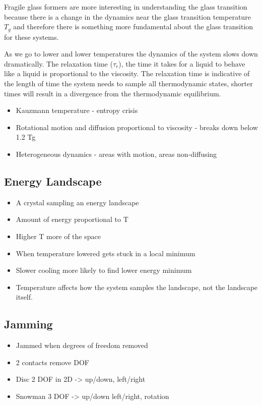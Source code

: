 Fragile glass formers are more interesting in understanding the glass transition because there is a change in the dynamics near the glass transition temperature $T_g$ and therefore there is something more fundamental about the glass transition for these systems. 

As we go to lower and lower temperatures the dynamics of the system slows down dramatically. The relaxation time ($\tau_r$), the time it takes for a liquid to behave like a liquid is proportional to the viscosity. The relaxation time is indicative of the length of time the system needs to sample all thermodynamic states, shorter times will result in a divergence from the thermodynamic equilibrium.

\begin{itemize}
    \item Kauzmann temperature - entropy crisis
    \item Rotational motion and diffusion proportional to viscosity - breaks down below 1.2 Tg
    \item Heterogeneous dynamics - areas with motion, areas non-diffusing
\end{itemize}

\subsection{Energy Landscape}

\begin{itemize}
    \item A crystal sampling an energy landscape
    \item Amount of energy proportional to T
    \item Higher T more of the space
    \item When temperature lowered gets stuck in a local minimum
    \item Slower cooling more likely to find lower energy minimum
    \item Temperature affects how the system samples the landscape, not the landscape itself.
\end{itemize}

\subsection{Jamming}
\begin{itemize}
    \item Jammed when degrees of freedom removed
    \item 2 contacts remove DOF
    \item Disc 2 DOF in 2D -> up/down, left/right
    \item Snowman 3 DOF -> up/down left/right, rotation
\end{itemize}
